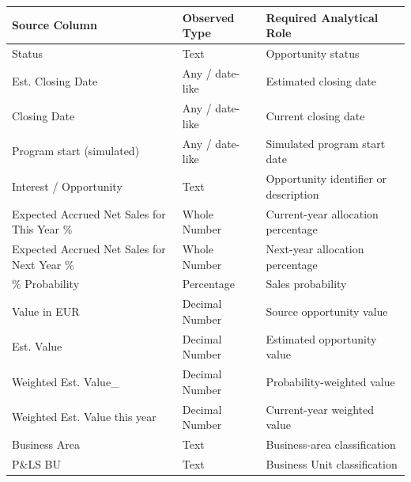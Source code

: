 \documentclass[11pt,a4paper]{article}
\begin{document}
\begin{tabularx}{\textwidth}{
    >{\ttfamily}p{5.8cm}
    p{3.4cm}
    X
}

\toprule

Source Column
&
Observed Type
&
Required Analytical Role
\\

\midrule

Status
&
Text
&
Opportunity status
\\

Est. Closing Date
&
Any / date-like
&
Estimated closing date
\\

Closing Date
&
Any / date-like
&
Current closing date
\\

Program start (simulated)
&
Any / date-like
&
Simulated program start date
\\

Interest / Opportunity
&
Text
&
Opportunity identifier or description
\\

Expected Accrued Net Sales for This Year \%
&
Whole Number
&
Current-year allocation percentage
\\

Expected Accrued Net Sales for Next Year \%
&
Whole Number
&
Next-year allocation percentage
\\

\% Probability
&
Percentage
&
Sales probability
\\

Value in EUR
&
Decimal Number
&
Source opportunity value
\\

Est. Value
&
Decimal Number
&
Estimated opportunity value
\\

Weighted Est. Value\_
&
Decimal Number
&
Probability-weighted value
\\

Weighted Est. Value this year
&
Decimal Number
&
Current-year weighted value
\\

Business Area
&
Text
&
Business-area classification
\\

P\&LS BU
&
Text
&
Business Unit classification
\\

\bottomrule

\end{tabularx}
\end{document}
